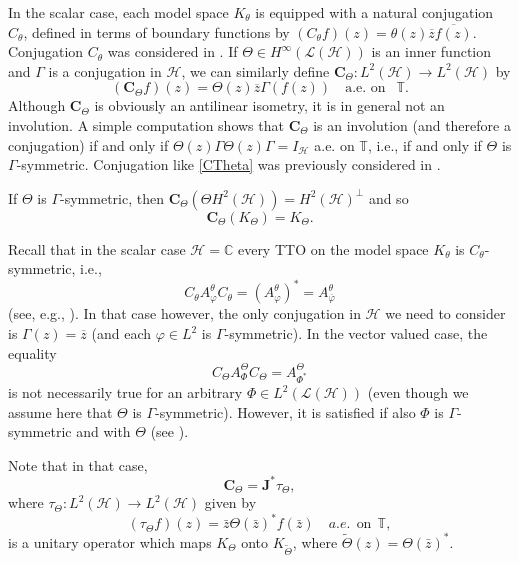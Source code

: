 \documentclass[12pt]{amsart}
\numberwithin{equation}{section}
\newcommand{\hsp}{\mathcal{H}}
\newcommand{\oL }{\mathcal{L}(\hsp) }
\newcommand{\C}{{\mathbf{C}}}
\newcommand{\J}{{\mathbf{J}}}
\theoremstyle{definition}
\numberwithin{equation}{section}
\begin{document}
In the scalar case, each model space $K_{\theta}$ is equipped with a natural conjugation $C_{\theta}$, defined in terms of boundary functions by
$(C_\theta f)(z)=\theta(z)\overline{z}\overline{f(z)}$. Conjugation $C_\theta$ was considered in \cite{sar}. If $\Theta\in H^\infty(\oL)$ is an inner function and $\Gamma$ is a conjugation in $\hsp$, we can similarly define $\C_{\Theta}:L^2(\hsp)\to L^2(\hsp)$ by
\begin{equation}\label{CTheta}
(\C_{\Theta}f)(z)=\Theta(z)\overline{z} \Gamma(f(z))\quad \text{a.e. on }~~\mathbb{T}.
\end{equation}
Although $\C_{\Theta}$ is obviously an antilinear isometry, it is in general not an involution. A simple computation shows that $\C_{\Theta}$ is an involution (and therefore a conjugation) if and only if $\Theta(z)\Gamma\Theta(z)\Gamma=I_{\hsp}$ a.e. on $\mathbb{T}$, i.e., if and only if $\Theta$ is $\Gamma$-symmetric. Conjugation like \eqref{CTheta} was previously considered in \cite{CKLP}.

If $\Theta$ is $\Gamma$-symmetric, then $\C_{\Theta}(\Theta H^2(\hsp))=H^2(\hsp)^{\perp}$ and so
$$\C_{\Theta}(K_\Theta)=K_\Theta.$$

Recall that in the scalar case $\hsp=\mathbb{C}$ every TTO on the model space $K_\theta$ is $C_\theta$-symmetric, i.e.,
$$C_\theta A_\varphi^\theta C_\theta=(A_\varphi^\theta)^*=A_{\overline{\varphi}}^\theta$$
(see, e.g., \cite{sar}). In that case however, the only conjugation in $\hsp$ we need to consider is $\Gamma(z)=\overline{z}$ (and each $\varphi\in L^2$ is $\Gamma$-symmetric). In the vector valued case, the equality
\begin{equation}\label{eq: 4.12}
C_{\Theta} A_{\Phi}^\Theta C_{\Theta}=A_{\Phi^*}^\Theta
\end{equation}
is not necessarily true for an arbitrary $\Phi\in L^2(\oL)$ (even though we assume here that $\Theta$ is $\Gamma$-symmetric). However, it is satisfied if also $\Phi$ is $\Gamma$-symmetric and  with $\Theta$ (see \cite{KT}).

Note that in that case,
$$\C_{\Theta}=\J^*\tau_\Theta,$$
where $\tau_{\Theta}: L^{2}(\hsp)\to L^{2}(\hsp)$ given by
\begin{equation}
(\tau_{\Theta}f)(z)=\bar z\Theta(\bar z)^{*}f(\bar z) \quad a.e. ~~\text{on}~~ \mathbb{T},
\end{equation}
 is a unitary operator which maps $K_{\Theta}$ onto $K_{\widetilde{\Theta}}$, where $\widetilde{\Theta}(z)=\Theta(\bar z)^{*}$.
\end{document}
